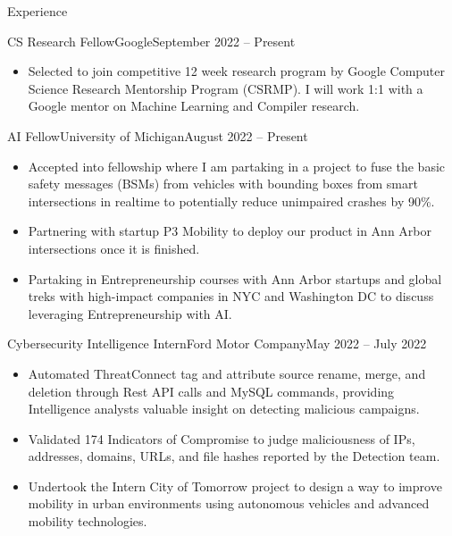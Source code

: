 \documentclass[]{mcdowellcv}
\begin{document}
	\begin{cvsection}{Experience}
		\begin{cvsubsection}{CS Research Fellow}{Google}{September 2022 -- Present}
			\small{
				\begin{itemize}
					\item Selected to join competitive 12 week research program by Google Computer Science Research Mentorship Program (CSRMP). I will work 1:1 with a Google mentor on Machine Learning and Compiler research.
				\end{itemize}
			}
		\end{cvsubsection}

		\begin{cvsubsection}{AI Fellow}{University of Michigan}{August 2022 -- Present}
			\small{
				\begin{itemize}
					\item Accepted into fellowship where I am partaking in a project to fuse the basic safety messages (BSMs) from vehicles with bounding boxes from smart intersections in realtime to potentially reduce unimpaired crashes by 90\%.
					\item Partnering with startup P3 Mobility to deploy our product in Ann Arbor intersections once it is finished.
					\item Partaking in Entrepreneurship courses with Ann Arbor startups and global treks with high-impact companies in NYC and Washington DC to discuss leveraging Entrepreneurship with AI.
				\end{itemize}
			}
		\end{cvsubsection}
		
		\begin{cvsubsection}{Cybersecurity Intelligence Intern}{Ford Motor Company}{May 2022 -- July 2022}
			\small{
				\begin{itemize}
					\item Automated ThreatConnect tag and attribute source rename, merge, and deletion through Rest API calls and MySQL commands, providing Intelligence analysts valuable insight on detecting malicious campaigns.
					\item Validated 174 Indicators of Compromise to judge maliciousness of IPs, addresses, domains, URLs, and file hashes reported by the Detection team.
					\item Undertook the Intern City of Tomorrow project to design a way to improve mobility in urban environments using autonomous vehicles and advanced mobility technologies.
				\end{itemize}
			}
		\end{cvsubsection}
		

\end{cvsection}
\end{document}
